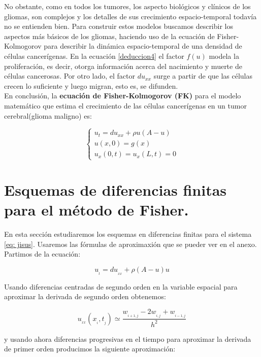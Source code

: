 No obstante, como en todos los tumores, los aspecto biológicos y clínicos de los gliomas, son complejos y los detalles de sus crecimiento espacio-temporal todavía no se entienden bien. Para construir estos modelos buscamos describir los aspectos más básicos  de los gliomas, haciendo uso de la ecuación de Fisher-Kolmogorov para describir la dinámica espacio-temporal de una densidad de células cancerígenas. En la ecuación \eqref{deduccion4} el factor $f(u)$ modela la proliferación, es decir, otorga información acerca del nacimiento y muerte de células cancerosas. Por otro lado, el factor $ d{ u }_{ xx }$ surge a partir de que las células crecen lo suficiente y luego migran, esto es, se difunden.\\

En conclusión, la \textbf{ecuación de Fisher-Kolmogorov (FK)} para el modelo matemático que estima el crecimiento de las células cancerígenas en un tumor cerebral(glioma maligno) es: 

\begin{equation}
	\label{eq: jisus}
	\displaystyle \begin{cases} { u }_{ t }=d{ u }_{ xx }+\rho u(A-u) \\ u(x,0)=g(x) \\ { u }_{ x }(0,t)={ u }_{ x }(L,t)=0 \end{cases}
\end{equation}
\section{Esquemas de diferencias finitas para el método de Fisher.}\label{diferenaciasfinitas}

En esta sección estudiaremos los esquemas en diferencias finitas para el sistema \eqref{eq: jisus}. Usaremos las fórmulas de aproximaxión que se pueder ver en el anexo. Partimos de la ecuación:

	$$u_{_{t}}=du_{_{xx}}+\rho(A-u)u$$

Usando diferencias centradas de segundo orden en la variable espacial para aproximar la derivada de segundo orden obtenemos: 

$$u_{_{xx}}(x_{_{i}},t_{_{j}})\simeq\frac{w_{_{i+1,j}}-2w_{_{i,j}}+w_{_{i-1,j}}}{h^{2}}$$

y usando ahora diferencias progresivas en el tiempo para aproximar la derivada de primer orden producimos la siguiente aproximación:

